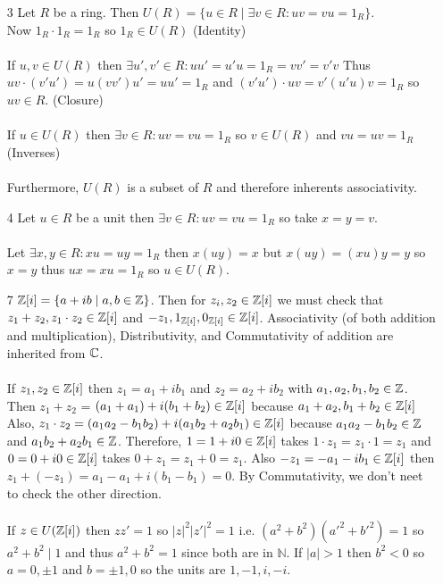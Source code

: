 \documentclass[12pt]{extarticle}
\begin{document}
\begin{enumerate}
\begin{enumerate}
\item[3] Let $R$ be a ring. Then $U(R) = \{ u \in R \mid \exists v \in R : uv = vu = 1_R \}$. \\ Now $1_R \cdot 1_R = 1_R$ so $1_R \in U(R)$ (Identity) \\ \\ 
If $u, v \in U(R)$ then $\exists u', v' \in R : uu' = u'u = 1_R = vv' = v'v$ Thus $uv \cdot (v'u') = u(vv')u' = uu' = 1_R$ and $(v'u') \cdot uv = v'(u'u)v = 1_R$ so $uv \in R$. (Closure) \\ \\
If $u \in U(R)$ then $\exists v \in R : uv = vu = 1_R$ so $v \in U(R)$ and $vu = uv = 1_R$ (Inverses) \\ \\
Furthermore, $U(R)$ is a subset of $R$ and therefore inherents associativity.  

\item[4] Let $u \in R$ be a unit then $\exists v \in R : uv = vu = 1_R$ so take $ x = y = v$. \\ \\ Let $\exists x, y \in R : xu = uy = 1_R$ then $x(uy) = x$ but $x(uy) = (xu)y = y$ so $x = y$ thus $ux = xu = 1_R$ so $u \in U(R)$. 

\item[7] $\mathbb{Z}[i] = \{a + ib \mid a, b \in \mathbb{Z} \}$. Then for $z_i, z_2 \in \mathbb{Z}[i]$ we must check that $z_1 + z_2, z_1 \cdot z_2 \in \mathbb{Z}[i]$ and $-z_1, 1_{\mathbb{Z}[i]}, 0_{\mathbb{Z}[i]} \in \mathbb{Z}[i]$. Associativity (of both addition and multiplication), Distributivity, and Commutativity of addition are inherited from $\mathbb{C}$. \\ \\
If $z_1, z_2 \in \mathbb{Z}[i]$ then $z_1 = a_1 + ib_1$ and $z_2 = a_2 + ib_2$ with $a_1, a_2, b_1, b_2 \in \mathbb{Z}$. Then $z_1 + z_2$ = $(a_1 + a_1) + i(b_1 + b_2) \in \mathbb{Z}[i]$ because $a_1 + a_2, b_1 + b_2 \in \mathbb{Z}[i]$ Also, $z_1 \cdot z_2 = (a_1 a_2 - b_1 b_2) + i(a_1b_2  + a_2 b_1) \in \mathbb{Z}[i]$ because $a_1 a_2 - b_1 b_2 \in \mathbb{Z}$ and $a_1b_2  + a_2 b_1 \in \mathbb{Z}$. Therefore, $1 = 1+i0 \in \mathbb{Z}[i]$ takes $1 \cdot z_1 = z_1 \cdot 1 = z_1$ and $0 = 0 + i0 \in \mathbb{Z}[i]$ takes $0 + z_1 = z_1 + 0 = z_1$. Also $-z_1 = -a_1 - i b_1 \in \mathbb{Z}[i]$ then $z_1 + (-z_1) = a_1 - a_1 + i(b_1 - b_1) = 0$. By Commutativity, we don't neet to check the other direction. \\ \\
If $z \in U(\mathbb{Z}[i])$ then $zz' = 1$ so $|z|^2 |z'|^2 = 1$ i.e. $(a^2 + b^2)(a'^2 + b'^2) = 1$ so $a^2 + b^2 \mid 1$ and thus $a^2 + b^2 = 1$ since both are in $\mathbb{N}$. If $|a| > 1$ then $b^2 < 0$ so $a = 0, \pm 1$ and $b = \pm 1, 0$ so the units are $1,-1, i,-i$. 


\end{enumerate}
\end{enumerate}
\end{document}

